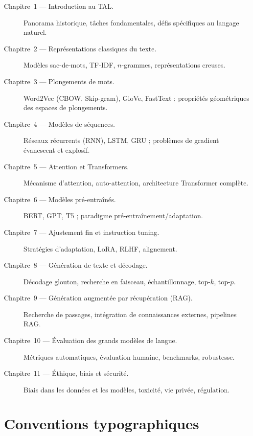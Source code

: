 \begin{description}
    \item[Chapitre~1 --- Introduction au TAL.]
        Panorama historique, t\^aches fondamentales, d\'efis sp\'ecifiques au
        langage naturel.
    \item[Chapitre~2 --- Repr\'esentations classiques du texte.]
        Mod\`eles sac-de-mots, TF-IDF, $n$-grammes, repr\'esentations creuses.
    \item[Chapitre~3 --- Plongements de mots.]
        Word2Vec (CBOW, Skip-gram), GloVe, FastText ; propri\'et\'es
        g\'eom\'etriques des espaces de plongements.
    \item[Chapitre~4 --- Mod\`eles de s\'equences.]
        R\'eseaux r\'ecurrents (RNN), LSTM, GRU ; probl\`emes de gradient
        \'evanescent et explosif.
    \item[Chapitre~5 --- Attention et Transformers.]
        M\'ecanisme d'attention, auto-attention, architecture Transformer
        compl\`ete.
    \item[Chapitre~6 --- Mod\`eles pr\'e-entra\^in\'es.]
        BERT, GPT, T5 ; paradigme pr\'e-entra\^inement/adaptation.
    \item[Chapitre~7 --- Ajustement fin et instruction tuning.]
        Strat\'egies d'adaptation, LoRA, RLHF, alignement.
    \item[Chapitre~8 --- G\'en\'eration de texte et d\'ecodage.]
        D\'ecodage glouton, recherche en faisceau, \'echantillonnage, top-$k$,
        top-$p$.
    \item[Chapitre~9 --- G\'en\'eration augment\'ee par r\'ecup\'eration (RAG).]
        Recherche de passages, int\'egration de connaissances externes, pipelines
        RAG.
    \item[Chapitre~10 --- \'Evaluation des grands mod\`eles de langue.]
        M\'etriques automatiques, \'evaluation humaine, benchmarks, robustesse.
    \item[Chapitre~11 --- \'Ethique, biais et s\'ecurit\'e.]
        Biais dans les donn\'ees et les mod\`eles, toxicit\'e, vie priv\'ee,
        r\'egulation.
\end{description}

\section*{Conventions typographiques}

